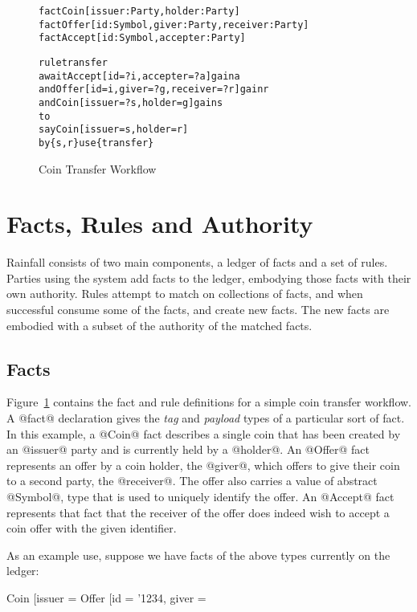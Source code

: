 
\clearpage{}


\begin{figure}
\begin{small}
\begin{alltt}
fact  Coin   [issuer: Party, holder: Party]
fact  Offer  [id: Symbol, giver: Party, receiver: Party]
fact  Accept [id: Symbol, accepter: Party]

rule  transfer
await Accept [id = ?i, accepter = ?a] gain a
  and Offer  [id = i,  giver = ?g, receiver = ?r] gain r
  and Coin   [issuer = ?s, holder = g] gain s
to
  say Coin  [issuer =  s, holder = r]
   by \{s, r\} use \{transfer\}
\end{alltt}
\end{small}
\caption{Coin Transfer Workflow}
\label{f:CoinTransfer}
\end{figure}


\section{Facts, Rules and Authority}
Rainfall consists of two main components, a ledger of facts and a set of rules. Parties using the system add facts to the ledger, embodying those facts with their own authority. Rules attempt to match on collections of facts, and when successful consume some of the facts, and create new facts. The new facts are embodied with a subset of the authority of the matched facts.

\subsection{Facts}
Figure~\ref{f:CoinTransfer} contains the fact and rule definitions for a simple coin transfer workflow. A @fact@ declaration gives the \emph{tag} and \emph{payload} types of a particular sort of fact. In this example, a @Coin@ fact describes a single coin that has been created by an @issuer@ party and is currently held by a @holder@. An @Offer@ fact represents an offer by a coin holder, the @giver@, which offers to give their coin to a second party, the @receiver@. The offer also carries a value of abstract @Symbol@, type that is used to uniquely identify the offer. An @Accept@ fact represents that fact that the receiver of the offer does indeed wish to accept a coin offer with the given identifier.

As an example use, suppose we have facts of the above types currently on the ledger:
\begin{small}
\begin{code}
 Coin   [issuer = %
 Offer  [id = '1234, giver = %
\end{code}
\end{small}

